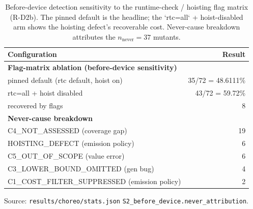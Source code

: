 \begin{table}[t]
\centering\footnotesize
\caption{Before-device detection sensitivity to the runtime-check / hoisting flag matrix (R-D2b). The pinned default is the headline; the `rtc=all` + hoist-disabled arm shows the hoisting defect's recoverable cost. Never-cause breakdown attributes the $n_\mathrm{never}=37$ mutants.}
\label{tab:rq5-ablation}
\begin{tabular}{@{}lr@{}}
\toprule
Configuration & Result \\
\midrule
\textbf{Flag-matrix ablation (before-device sensitivity)} &  \\
pinned default (rtc default, hoist on) & 35/72 = 48.6111\% \\
rtc=all + hoist disabled & 43/72 = 59.72\% \\
recovered by flags & 8 \\
\textbf{Never-cause breakdown} &  \\
C4\_NOT\_ASSESSED (coverage gap) & 19 \\
HOISTING\_DEFECT (emission policy) & 6 \\
C5\_OUT\_OF\_SCOPE (value error) & 6 \\
C3\_LOWER\_BOUND\_OMITTED (gen bug) & 4 \\
C1\_COST\_FILTER\_SUPPRESSED (emission policy) & 2 \\
\bottomrule
\end{tabular}
\vspace{0.4em}\begin{minipage}{0.98\linewidth}\raggedright\footnotesize Source: \texttt{results/choreo/stats.json} \texttt{S2\_before\_device.never\_attribution}.\end{minipage}
\end{table}
